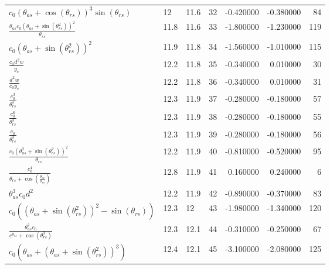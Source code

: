 \begin{tabularx}{\textwidth}{lllrrrr}
$ c_{0} \left(\theta_{as} + \cos{\left(\theta_{rs} \right)}\right)^{3} \sin{\left(\theta_{rs} \right)} $  &  12\phantom{.0}  &  11.6  &  32  &  -0.420000  &  -0.380000  &  84  \\ 
$ \displaystyle\frac{\theta_{as} c_{0} \left(\theta_{as} + \sin{\left(\theta_{rs}^{2} \right)}\right)^{2}}{\theta_{rs}} $  &  11.8  &  11.6  &  33  &  -1.800000  &  -1.230000  &  119  \\ 
$ c_{0} \left(\theta_{as} + \sin{\left(\theta_{rs}^{2} \right)}\right)^{2} $  &  11.9  &  11.8  &  34  &  -1.560000  &  -1.010000  &  115  \\ 
$ \displaystyle\frac{c_{0} d^{2} w}{y_c} $  &  12.2  &  11.8  &  35  &  -0.340000  &  0.010000  &  30  \\ 
$ \displaystyle\frac{d^{2} w}{c_{0} y_c} $  &  12.2  &  11.8  &  36  &  -0.340000  &  0.010000  &  31  \\ 
$ \displaystyle\frac{c_{0}^{3}}{\theta_{rs}^{3}} $  &  12.3  &  11.9  &  37  &  -0.280000  &  -0.180000  &  57  \\ 
$ \displaystyle\frac{c_{0}^{6}}{\theta_{rs}^{3}} $  &  12.3  &  11.9  &  38  &  -0.280000  &  -0.180000  &  55  \\ 
$ \displaystyle\frac{c_{0}}{\theta_{rs}^{3}} $  &  12.3  &  11.9  &  39  &  -0.280000  &  -0.180000  &  56  \\ 
$ \displaystyle\frac{c_{0} \left(\theta_{as}^{2} + \sin{\left(\theta_{rs}^{2} \right)}\right)^{2}}{\theta_{rs}} $  &  12.2  &  11.9  &  40  &  -0.810000  &  -0.520000  &  95  \\ 
$ \displaystyle\frac{c_{0}^{4}}{\theta_{rs} + \cos{\left(\displaystyle\frac{\theta_{as}}{\theta_{rs}} \right)}} $  &  12.8  &  11.9  &  41  &  0.160000  &  0.240000  &  6  \\ 
$ \theta_{as}^{3} c_{0} d^{2} $  &  12.2  &  11.9  &  42  &  -0.890000  &  -0.370000  &  83  \\ 
$ c_{0} \left(\left(\theta_{as} + \sin{\left(\theta_{rs}^{2} \right)}\right)^{2} - \sin{\left(\theta_{rs} \right)}\right) $  &  12.3  &  12\phantom{.0}  &  43  &  -1.980000  &  -1.340000  &  120  \\ 
$ \displaystyle\frac{\theta_{as}^{2} c_{0}}{e^{\theta_{rs}} + \cos{\left(\theta_{rs}^{3} \right)}} $  &  12.3  &  12.1  &  44  &  -0.310000  &  -0.250000  &  67  \\ 
$ c_{0} \left(\theta_{as} + \left(\theta_{as} + \sin{\left(\theta_{rs}^{2} \right)}\right)^{3}\right) $  &  12.4  &  12.1  &  45  &  -3.100000  &  -2.080000  &  125  \\ 

\end{tabularx}
